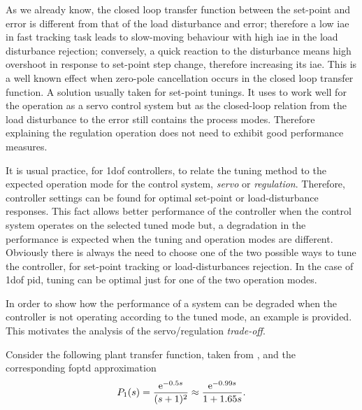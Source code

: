 As we already know, the closed loop transfer function between the set-point and error is different from that of the load disturbance and error; therefore a low \gls{iae} in fast tracking task leads to slow-moving behaviour with high \gls{iae} in the load disturbance rejection; conversely, a quick reaction to the disturbance means high overshoot in response to set-point step change, therefore increasing its \gls{iae}. This is a well known effect when zero-pole cancellation occurs in the closed loop transfer function. A solution usually taken for set-point tunings. It uses to work well for the operation as a servo control system but as the closed-loop relation from the load disturbance to the error still contains the process modes. Therefore explaining the regulation operation does not need to exhibit good performance measures.
 
It is usual practice, for \gls{1dof} controllers, to relate the tuning method to the expected operation mode for the control system, \emph{servo} or \emph{regulation}. Therefore, controller settings can be found for optimal set-point or load-disturbance responses. This fact allows better performance of the controller when the control system operates on the selected tuned mode but, a degradation in the performance is expected when the tuning and operation modes are different. Obviously there is always the need to choose one of the two possible ways to tune the controller, for set-point tracking or load-disturbances rejection. In the case of \gls{1dof} \gls{pid}, tuning can be optimal just for one of the two operation modes.

In order to show how the performance of a system can be degraded when the controller is not operating according to the tuned mode, an example is provided. This motivates the analysis of the servo/regulation \emph{trade-off}.

Consider the following plant transfer function, taken from \citet{zhuang1993}, and the corresponding \gls{foptd} approximation 
%
\begin{equation}
P_1(s)=\frac{\mathrm{e}^{-0.5s}}{(s+1)^2} \approx \frac{\mathrm{e}^{-0.99s}}{1+1.65s}. \label{system_example} 
\end{equation}

